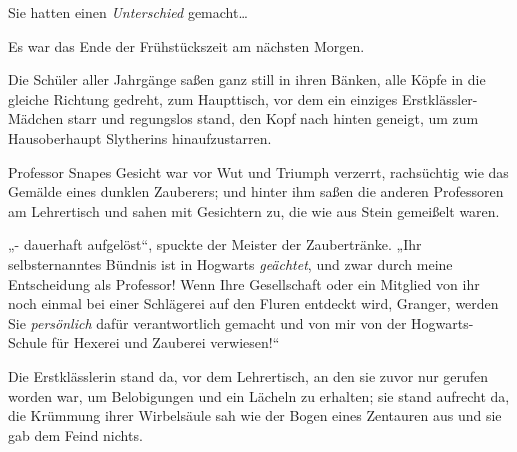 Sie hatten einen \emph{Unterschied} gemacht…

\later

Es war das Ende der Frühstückszeit am nächsten Morgen.

Die Schüler aller Jahrgänge saßen ganz still in ihren Bänken, alle Köpfe in die gleiche Richtung gedreht, zum Haupttisch, vor dem ein einziges Erstklässler-Mädchen starr und regungslos stand, den Kopf nach hinten geneigt, um zum Hausoberhaupt Slytherins hinaufzustarren.

Professor Snapes Gesicht war vor Wut und Triumph verzerrt, rachsüchtig wie das Gemälde eines dunklen Zauberers; und hinter ihm saßen die anderen Professoren am Lehrertisch und sahen mit Gesichtern zu, die wie aus Stein gemeißelt waren.

„- dauerhaft aufgelöst“, spuckte der Meister der Zaubertränke. „Ihr selbsternanntes Bündnis ist in Hogwarts \emph{geächtet}, und zwar durch meine Entscheidung als Professor! Wenn Ihre Gesellschaft oder ein Mitglied von ihr noch einmal bei einer Schlägerei auf den Fluren entdeckt wird, Granger, werden Sie \emph{persönlich} dafür verantwortlich gemacht und von mir von der Hogwarts-Schule für Hexerei und Zauberei verwiesen!“

Die Erstklässlerin stand da, vor dem Lehrertisch, an den sie zuvor nur gerufen worden war, um Belobigungen und ein Lächeln zu erhalten; sie stand aufrecht da, die Krümmung ihrer Wirbelsäule sah wie der Bogen eines Zentauren aus und sie gab dem Feind nichts.

